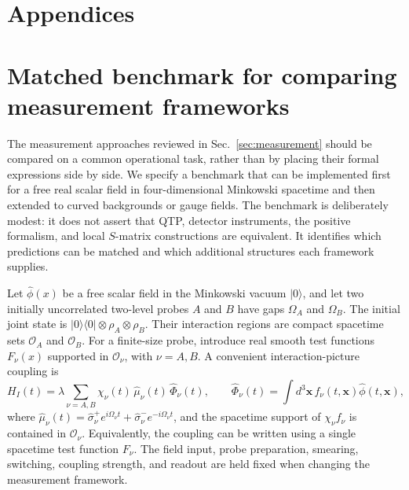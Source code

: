 \documentclass[pdflatex,sn-mathphys-num]{sn-jnl}
\begin{document}
\appendix
\section*{Appendices}
\makeatletter
{}
\makeatother
\renewcommand{\thefigure}{\thesection.\arabic{figure}}
\renewcommand{\thetable}{\thesection.\arabic{table}}
\renewcommand{\theHsection}{appendix.\Alph{section}}
\renewcommand{\theHequation}{appendix.\Alph{section}.\arabic{equation}}
\renewcommand{\theHfigure}{appendix.\Alph{section}.\arabic{figure}}
\renewcommand{\theHtable}{appendix.\Alph{section}.\arabic{table}}

\section{Matched benchmark for comparing measurement frameworks}
\label{app:measurement-benchmark}



The measurement approaches reviewed in Sec.~\ref{sec:measurement} should be compared on a common operational task, rather than by placing their formal expressions side by side. We specify a benchmark that can be implemented first for a free real scalar field in four-dimensional Minkowski spacetime and then extended to curved backgrounds or gauge fields. The benchmark is deliberately modest: it does not assert that QTP, detector instruments, the positive formalism, and local $S$-matrix constructions are equivalent. It identifies which predictions can be matched and which additional structures each framework supplies.

Let $\hat\phi(x)$ be a free scalar field in the Minkowski vacuum $|0\rangle$, and let two initially uncorrelated two-level probes $A$ and $B$ have gaps $\Omega_A$ and $\Omega_B$. The initial joint state is $|0\rangle\langle0|\otimes\rho_A\otimes\rho_B$. Their interaction regions are compact spacetime sets $\mathcal O_A$ and $\mathcal O_B$. For a finite-size probe, introduce real smooth test functions $F_\nu(x)$ supported in $\mathcal O_\nu$, with $\nu=A,B$. A convenient interaction-picture coupling is
\begin{equation}
H_I(t)=\lambda\sum_{\nu=A,B}\chi_\nu(t)\,
\hat\mu_\nu(t)\,\hat\Phi_\nu(t),\qquad
\hat\Phi_\nu(t)=\int d^3\mathbf x\,f_\nu(t,\mathbf x)\hat\phi(t,\mathbf x),
\label{eq:benchmark-interaction}
\end{equation}
where $\hat\mu_\nu(t)=\hat\sigma_\nu^+e^{i\Omega_\nu t}
+\hat\sigma_\nu^-e^{-i\Omega_\nu t}$, and the spacetime support of
$\chi_\nu f_\nu$ is contained in $\mathcal O_\nu$. Equivalently, the coupling can be written using a single spacetime test function $F_\nu$. The field input, probe preparation, smearing, switching, coupling strength, and readout are held fixed when changing the measurement framework.
\end{document}
